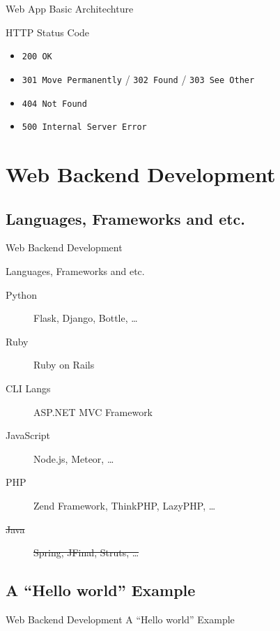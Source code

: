 \documentclass{beamer}
\begin{document}
\begin{frame}[fragile]{Web App Basic Architechture}
    \begin{block}{HTTP Status Code}
        \begin{itemize}
            \item \verb|200 OK|
            \item \verb|301 Move Permanently| / \verb|302 Found| / \verb|303 See Other|
            \item \verb|404 Not Found|
            \item \verb|500 Internal Server Error|
        \end{itemize}
    \end{block}
\end{frame}

\section{Web Backend Development}

\subsection{Languages, Frameworks and etc.}
\begin{frame}{Web Backend Development}
    \begin{block}{Languages, Frameworks and etc.}
        \begin{description}
            \item[Python] Flask, Django, Bottle, \ldots
            \item[Ruby] Ruby on Rails
            \item[CLI Langs\footnotemark] ASP.NET MVC Framework
            \item[JavaScript] Node.js, Meteor, \ldots
            \item[PHP] Zend Framework, ThinkPHP, LazyPHP, \ldots
            \item[\sout{Java}] \sout{Spring, JFinal, Struts, \ldots}
        \end{description}
    \end{block}

\end{frame}

\subsection{A ``Hello world'' Example}
\begin{frame}{Web Backend Development}
    \center\Huge
    A ``Hello world'' Example
\end{frame}
\end{document}
